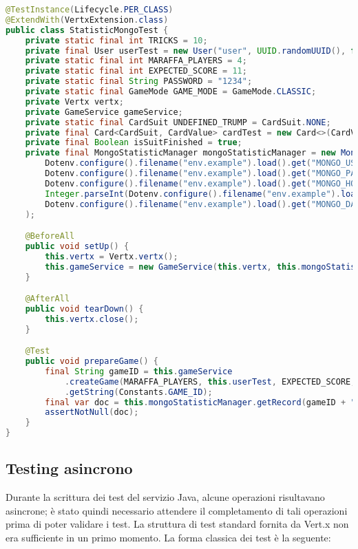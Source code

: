 \begin{lstlisting}[language=Java, caption={Esempio di test di integrazione per MongoDB}, label=list:mongo_test]
@TestInstance(Lifecycle.PER_CLASS)
@ExtendWith(VertxExtension.class)
public class StatisticMongoTest {
    private static final int TRICKS = 10;
    private final User userTest = new User("user", UUID.randomUUID(), false);
    private static final int MARAFFA_PLAYERS = 4;
    private static final int EXPECTED_SCORE = 11;
    private static final String PASSWORD = "1234";
    private static final GameMode GAME_MODE = GameMode.CLASSIC;
    private Vertx vertx;
    private GameService gameService;
    private static final CardSuit UNDEFINED_TRUMP = CardSuit.NONE;
    private final Card<CardSuit, CardValue> cardTest = new Card<>(CardValue.THREE, CardSuit.CLUBS);
    private final Boolean isSuitFinished = true;
    private final MongoStatisticManager mongoStatisticManager = new MongoStatisticManager(
        Dotenv.configure().filename("env.example").load().get("MONGO_USER", "user"),
        Dotenv.configure().filename("env.example").load().get("MONGO_PASSWORD", "password"),
        Dotenv.configure().filename("env.example").load().get("MONGO_HOST", "localhost"),
        Integer.parseInt(Dotenv.configure().filename("env.example").load().get("MONGO_PORT", "27127")),
        Dotenv.configure().filename("env.example").load().get("MONGO_DATABASE", "maraffa-test")
    );

    @BeforeAll
    public void setUp() {
        this.vertx = Vertx.vertx();
        this.gameService = new GameService(this.vertx, this.mongoStatisticManager);
    }

    @AfterAll
    public void tearDown() {
        this.vertx.close();
    }

    @Test
    public void prepareGame() {
        final String gameID = this.gameService
            .createGame(MARAFFA_PLAYERS, this.userTest, EXPECTED_SCORE, GAME_MODE.toString())
            .getString(Constants.GAME_ID);
        final var doc = this.mongoStatisticManager.getRecord(gameID + "-0");
        assertNotNull(doc);
    }
}
\end{lstlisting}
\vspace{1cm}

\subsection{Testing asincrono}

Durante la scrittura dei test del servizio Java, alcune operazioni risultavano asincrone; è stato quindi necessario attendere il completamento di tali operazioni prima di poter validare i test.  
La struttura di test standard fornita da Vert.x non era sufficiente in un primo momento. La forma classica dei test è la seguente:

